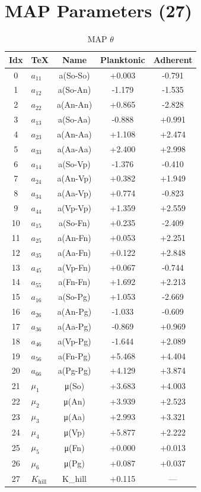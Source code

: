 \documentclass[11pt,a4paper]{article}
\begin{document}
\section{MAP Parameters (27)}
\begin{table}[H]\centering\small
\caption{MAP $\theta$}
\begin{tabular}{clccc}
\toprule
Idx & TeX & Name & Planktonic & Adherent \\
\midrule
    0 & $a_{11}$ & a(So-So)     & +0.003 & -0.791 \\
    1 & $a_{12}$ & a(So-An)     & -1.179 & -1.535 \\
    2 & $a_{22}$ & a(An-An)     & +0.865 & -2.828 \\
    3 & $a_{13}$ & a(So-Aa)     & -0.888 & +0.991 \\
    4 & $a_{23}$ & a(An-Aa)     & +1.108 & +2.474 \\
    5 & $a_{33}$ & a(Aa-Aa)     & +2.400 & +2.998 \\
    6 & $a_{14}$ & a(So-Vp)     & -1.376 & -0.410 \\
    7 & $a_{24}$ & a(An-Vp)     & +0.382 & +1.949 \\
    8 & $a_{34}$ & a(Aa-Vp)     & +0.774 & -0.823 \\
    9 & $a_{44}$ & a(Vp-Vp)     & +1.359 & +2.559 \\
    10 & $a_{15}$ & a(So-Fn)     & +0.235 & -2.409 \\
    11 & $a_{25}$ & a(An-Fn)     & +0.053 & +2.251 \\
    12 & $a_{35}$ & a(Aa-Fn)     & +0.122 & +2.848 \\
    13 & $a_{45}$ & a(Vp-Fn)     & +0.067 & -0.744 \\
    14 & $a_{55}$ & a(Fn-Fn)     & +1.692 & +2.213 \\
    15 & $a_{16}$ & a(So-Pg)     & +1.053 & -2.669 \\
    16 & $a_{26}$ & a(An-Pg)     & -1.033 & -0.609 \\
    17 & $a_{36}$ & a(Aa-Pg)     & -0.869 & +0.969 \\
    18 & $a_{46}$ & a(Vp-Pg)     & -1.644 & +2.089 \\
    19 & $a_{56}$ & a(Fn-Pg)     & +5.468 & +4.404 \\
    20 & $a_{66}$ & a(Pg-Pg)     & +4.129 & +3.874 \\
    21 & $\mu_1$ & μ(So)        & +3.683 & +4.003 \\
    22 & $\mu_2$ & μ(An)        & +3.939 & +2.523 \\
    23 & $\mu_3$ & μ(Aa)        & +2.993 & +3.321 \\
    24 & $\mu_4$ & μ(Vp)        & +5.877 & +2.222 \\
    25 & $\mu_5$ & μ(Fn)        & +0.000 & +0.013 \\
    26 & $\mu_6$ & μ(Pg)        & +0.087 & +0.037 \\
    27 & $K_\mathrm{hill}$ & K_hill       & +0.115 & --- \\
\bottomrule
\end{tabular}
\end{table}
\end{document}
